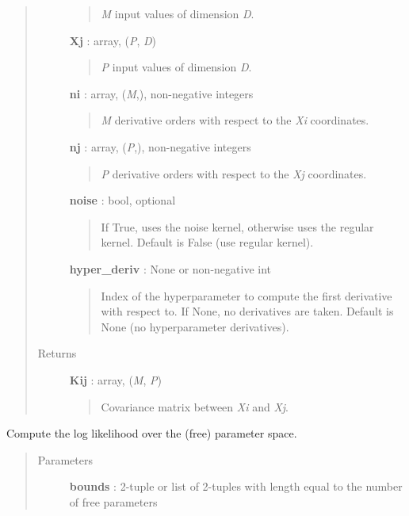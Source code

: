 \documentclass[letterpaper,10pt,english]{sphinxmanual}
\begin{document}
\begin{fulllineitems}
\begin{fulllineitems}
\begin{quote}
\begin{description}
\begin{quote}
\emph{M} input values of dimension \emph{D}.
\end{quote}

\textbf{Xj} : array, (\emph{P}, \emph{D})
\begin{quote}

\emph{P} input values of dimension \emph{D}.
\end{quote}

\textbf{ni} : array, (\emph{M},), non-negative integers
\begin{quote}

\emph{M} derivative orders with respect to the \emph{Xi} coordinates.
\end{quote}

\textbf{nj} : array, (\emph{P},), non-negative integers
\begin{quote}

\emph{P} derivative orders with respect to the \emph{Xj} coordinates.
\end{quote}

\textbf{noise} : bool, optional
\begin{quote}

If True, uses the noise kernel, otherwise uses the regular kernel.
Default is False (use regular kernel).
\end{quote}

\textbf{hyper\_deriv} : None or non-negative int
\begin{quote}

Index of the hyperparameter to compute the first derivative with
respect to. If None, no derivatives are taken. Default is None (no
hyperparameter derivatives).
\end{quote}

\item[{Returns}] \leavevmode
\textbf{Kij} : array, (\emph{M}, \emph{P})
\begin{quote}

Covariance matrix between \emph{Xi} and \emph{Xj}.
\end{quote}

\end{description}\end{quote}

\end{fulllineitems}


\begin{fulllineitems}
\label{gptools:gptools.gaussian_process.GaussianProcess.compute_ll_matrix}
Compute the log likelihood over the (free) parameter space.
\begin{quote}\begin{description}
\item[{Parameters}] \leavevmode
\textbf{bounds} : 2-tuple or list of 2-tuples with length equal to the number of free parameters
\begin{quote}


\end{quote}
\end{description}
\end{quote}
\end{fulllineitems}
\end{fulllineitems}
\end{document}
